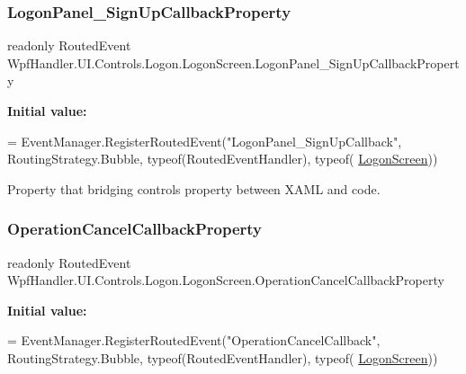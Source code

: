 \subsubsection{\texorpdfstring{Logon\+Panel\+\_\+\+Sign\+Up\+Callback\+Property}{LogonPanel\_SignUpCallbackProperty}}
{\footnotesize\ttfamily readonly Routed\+Event Wpf\+Handler.\+U\+I.\+Controls.\+Logon.\+Logon\+Screen.\+Logon\+Panel\+\_\+\+Sign\+Up\+Callback\+Property\hspace{0.3cm}{\ttfamily [static]}}

{\bfseries Initial value\+:}
\begin{DoxyCode}
= EventManager.RegisterRoutedEvent(\textcolor{stringliteral}{"LogonPanel\_SignUpCallback"},
            RoutingStrategy.Bubble, typeof(RoutedEventHandler), typeof(
      \mbox{\hyperlink{class_wpf_handler_1_1_u_i_1_1_controls_1_1_logon_1_1_logon_screen_aa74e0f26e834f7bf226796df3ea1bdfa}{LogonScreen}}))
\end{DoxyCode}


Property that bridging control\textquotesingle{}s property between X\+A\+ML and code. 

\mbox{\label{class_wpf_handler_1_1_u_i_1_1_controls_1_1_logon_1_1_logon_screen_a2d6e87038fcb0e1594e5ee244853d347}} 
\subsubsection{\texorpdfstring{Operation\+Cancel\+Callback\+Property}{OperationCancelCallbackProperty}}
{\footnotesize\ttfamily readonly Routed\+Event Wpf\+Handler.\+U\+I.\+Controls.\+Logon.\+Logon\+Screen.\+Operation\+Cancel\+Callback\+Property\hspace{0.3cm}{\ttfamily [static]}}

{\bfseries Initial value\+:}
\begin{DoxyCode}
= EventManager.RegisterRoutedEvent(\textcolor{stringliteral}{"OperationCancelCallback"},
            RoutingStrategy.Bubble, typeof(RoutedEventHandler), typeof(
      \mbox{\hyperlink{class_wpf_handler_1_1_u_i_1_1_controls_1_1_logon_1_1_logon_screen_aa74e0f26e834f7bf226796df3ea1bdfa}{LogonScreen}}))
\end{DoxyCode}


